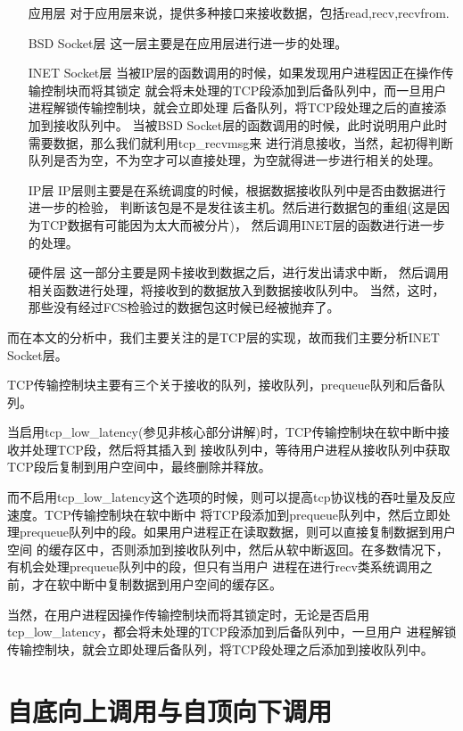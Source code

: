 \begin{enumerate}
\item[应用层]				对于应用层来说，提供多种接口来接收数据，包括read,recv,recvfrom.
\item[BSD Socket层]			这一层主要是在应用层进行进一步的处理。
\item[INET Socket层]			当被IP层的函数调用的时候，如果发现用户进程因正在操作传输控制块而将其锁定
						就会将未处理的TCP段添加到后备队列中，而一旦用户进程解锁传输控制块，就会立即处理
						后备队列，将TCP段处理之后的直接添加到接收队列中。
						当被BSD Socket层的函数调用的时候，此时说明用户此时需要数据，那么我们就利用tcp\_recvmsg来
						进行消息接收，当然，起初得判断队列是否为空，不为空才可以直接处理，为空就得进一步进行相关的处理。
\item[IP层]					IP层则主要是在系统调度的时候，根据数据接收队列中是否由数据进行进一步的检验，
						判断该包是不是发往该主机。然后进行数据包的重组(这是因为TCP数据有可能因为太大而被分片)，
						然后调用INET层的函数进行进一步的处理。
\item[硬件层]     			这一部分主要是网卡接收到数据之后，进行发出请求中断，
				  		然后调用相关函数进行处理，将接收到的数据放入到数据接收队列中。
						当然，这时，那些没有经过FCS检验过的数据包这时候已经被抛弃了。
\end{enumerate}

		而在本文的分析中，我们主要关注的是TCP层的实现，故而我们主要分析INET Socket层。

		TCP传输控制块主要有三个关于接收的队列，接收队列，prequeue队列和后备队列。

		当启用tcp\_low\_latency(参见非核心部分讲解)时，TCP传输控制块在软中断中接收并处理TCP段，然后将其插入到
		接收队列中，等待用户进程从接收队列中获取TCP段后复制到用户空间中，最终删除并释放。

		而不启用tcp\_low\_latency这个选项的时候，则可以提高tcp协议栈的吞吐量及反应速度。TCP传输控制块在软中断中
		将TCP段添加到prequeue队列中，然后立即处理prequeue队列中的段。如果用户进程正在读取数据，则可以直接复制数据到用户空间
		的缓存区中，否则添加到接收队列中，然后从软中断返回。在多数情况下，有机会处理prequeue队列中的段，但只有当用户
		进程在进行recv类系统调用之前，才在软中断中复制数据到用户空间的缓存区。

		当然，在用户进程因操作传输控制块而将其锁定时，无论是否启用tcp\_low\_latency，都会将未处理的TCP段添加到后备队列中，一旦用户
		进程解锁传输控制块，就会立即处理后备队列，将TCP段处理之后添加到接收队列中。
	\section{自底向上调用与自顶向下调用}
